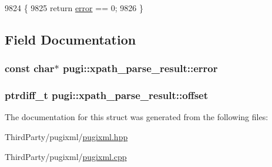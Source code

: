 \begin{DoxyCode}
9824     \{
9825         \textcolor{keywordflow}{return} \hyperlink{structpugi_1_1xpath__parse__result_ab2c625be89b995afac829012bc749fe4}{error} == 0;
9826     \}
\end{DoxyCode}


\subsection{Field Documentation}
\hypertarget{structpugi_1_1xpath__parse__result_ab2c625be89b995afac829012bc749fe4}{
\subsubsection[{error}]{\setlength{\rightskip}{0pt plus 5cm}const char$\ast$ pugi\-::xpath\-\_\-parse\-\_\-result\-::error}}\label{structpugi_1_1xpath__parse__result_ab2c625be89b995afac829012bc749fe4}
\hypertarget{structpugi_1_1xpath__parse__result_add47d886c654b4d8a836573b2c2a7acb}{
\subsubsection[{offset}]{\setlength{\rightskip}{0pt plus 5cm}ptrdiff\-\_\-t pugi\-::xpath\-\_\-parse\-\_\-result\-::offset}}\label{structpugi_1_1xpath__parse__result_add47d886c654b4d8a836573b2c2a7acb}


The documentation for this struct was generated from the following files\-:\begin{DoxyCompactItemize}
\item 
Third\-Party/pugixml/\hyperlink{pugixml_8hpp}{pugixml.\-hpp}\item 
Third\-Party/pugixml/\hyperlink{pugixml_8cpp}{pugixml.\-cpp}\end{DoxyCompactItemize}

